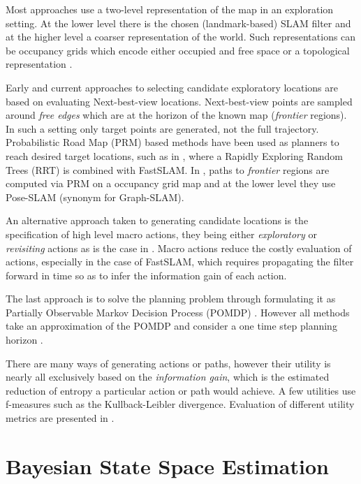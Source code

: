 Most approaches use a two-level representation of the map in an exploration setting. At the lower level
there is the chosen (landmark-based) SLAM filter and at the higher level a coarser representation of the world.
Such representations can be occupancy grids \cite{Thrun_grid_based_1996} which encode either occupied and free space
or a topological representation \cite{Kollar_2008_Exploration_SLAM}.

Early and current approaches to selecting candidate exploratory locations are based on evaluating 
Next-best-view \cite{Navigation_strategires_for_exploring_indoor_environments} locations. Next-best-view points are 
sampled around \textit{free edges} which are at the horizon of the known map (\textit{frontier} regions). 
In such a setting only target points are generated, not the full trajectory. Probabilistic Road Map (PRM) \cite{PRM_1996}
based methods have been used as planners to reach desired target locations, such as in \cite{RRT-SLAM}, where a Rapidly
Exploring Random Trees (RRT) is combined with FastSLAM. In \cite{ActivePosSLAM}, paths to \textit{frontier} regions are computed
via PRM  on a occupancy grid map and at the lower level they use Pose-SLAM (synonym for Graph-SLAM).

An alternative approach taken to generating candidate locations is the specification of high level macro actions, they being either 
\textit{exploratory} or \textit{revisiting} actions as is the case in \cite{stachniss05robotics}. Macro actions
reduce the costly evaluation of actions, especially in the case of FastSLAM, which requires propagating the filter 
forward in time so as to infer the information gain of each action.

The last approach is to solve the planning problem through formulating it as  Partially Observable Markov Decision Process (POMDP) \cite{Ross08onlineplanning}. 
However all methods take an approximation of the POMDP and consider a one time step planning horizon \cite[p.37]{GeorgiosLidoris}.

There are many ways of generating actions or paths, however their utility is nearly all exclusively based on the \textit{information gain}, 
which is the estimated reduction of entropy a particular action or path would achieve. A few utilities use f-measures such as the Kullback-Leibler divergence. 
Evaluation of different utility metrics are presented in \cite{Active_SLAM_Uncertainty_compar,KL_SLAM_exploration_PF}.



\section{Bayesian State Space Estimation}\label{ch5:BSSE}

